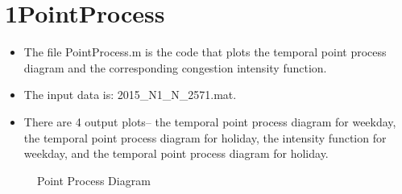 \documentclass{article}
\begin{document}
\section{1PointProcess}
\begin{itemize}
	\item The file PointProcess.m is the code that plots the temporal point process diagram and the corresponding congestion intensity function.
	\item The input data is: 2015\_N1\_N\_2571.mat.
	\item There are 4 output plots-- the temporal point process diagram for weekday, the temporal point process diagram for holiday, the intensity function for weekday, and the temporal point process diagram for holiday.
\end{itemize}
\begin{figure}[h!]
\begin{center}
	\vspace{-0.3in}
	\caption{Point Process Diagram}%
\end{center}
\end{figure}
\end{document}
